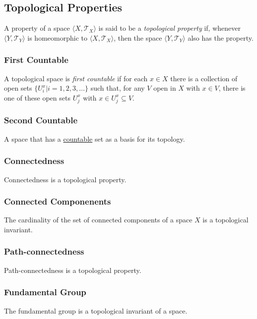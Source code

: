 \subsection{Topological Properties}\label{topologicalproperties}
A property of a space $\langle X,\mathcal{T}_X \rangle$ is said to be a \emph{topological property} if, whenever $\langle Y, \mathcal{T}_Y \rangle$ is homeomorphic to $\langle X,\mathcal{T}_X \rangle$, then the space $\langle Y,\mathcal{T}_Y \rangle$
also has the property.

\subsubsection{First Countable}\label{firstcountable}
A topological space is \emph{first countable} if for each $x \in X$ there is a collection of open sets $\{ U^x_i | i = 1,2,3,\dots \}$ such that,
for any $V$ open in $X$ with $x \in V$, there is one of these open sets $U^x_j$ with $x \in U^x_j \subseteq V$.

\subsubsection{Second Countable}\label{secondcountable}
A space that has a \hyperref[countable]{countable} set as a basis for its topology.

\subsubsection{Connectedness}
Connectedness is a topological property.

\subsubsection{Connected Componenents}
The cardinality of the set of connected components of a space $X$ is a topological invariant.

\subsubsection{Path-connectedness}
Path-connectedness is a topological property.

\subsubsection{Fundamental Group}
The fundamental group is a topological invariant of a space.